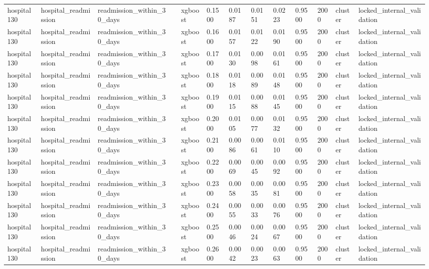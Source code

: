 \begin{tabular}{lllllllllllll}
hospital130 & hospital\_readmission & readmission\_within\_30\_days &  & xgboost & 0.1500 & 0.0187 & 0.0151 & 0.0223 & 0.9500 & 2000 & cluster & locked\_internal\_validation \\
hospital130 & hospital\_readmission & readmission\_within\_30\_days &  & xgboost & 0.1600 & 0.0157 & 0.0122 & 0.0190 & 0.9500 & 2000 & cluster & locked\_internal\_validation \\
hospital130 & hospital\_readmission & readmission\_within\_30\_days &  & xgboost & 0.1700 & 0.0130 & 0.0098 & 0.0161 & 0.9500 & 2000 & cluster & locked\_internal\_validation \\
hospital130 & hospital\_readmission & readmission\_within\_30\_days &  & xgboost & 0.1800 & 0.0118 & 0.0089 & 0.0148 & 0.9500 & 2000 & cluster & locked\_internal\_validation \\
hospital130 & hospital\_readmission & readmission\_within\_30\_days &  & xgboost & 0.1900 & 0.0115 & 0.0088 & 0.0145 & 0.9500 & 2000 & cluster & locked\_internal\_validation \\
hospital130 & hospital\_readmission & readmission\_within\_30\_days &  & xgboost & 0.2000 & 0.0105 & 0.0077 & 0.0132 & 0.9500 & 2000 & cluster & locked\_internal\_validation \\
hospital130 & hospital\_readmission & readmission\_within\_30\_days &  & xgboost & 0.2100 & 0.0086 & 0.0061 & 0.0110 & 0.9500 & 2000 & cluster & locked\_internal\_validation \\
hospital130 & hospital\_readmission & readmission\_within\_30\_days &  & xgboost & 0.2200 & 0.0069 & 0.0045 & 0.0092 & 0.9500 & 2000 & cluster & locked\_internal\_validation \\
hospital130 & hospital\_readmission & readmission\_within\_30\_days &  & xgboost & 0.2300 & 0.0058 & 0.0035 & 0.0081 & 0.9500 & 2000 & cluster & locked\_internal\_validation \\
hospital130 & hospital\_readmission & readmission\_within\_30\_days &  & xgboost & 0.2400 & 0.0055 & 0.0033 & 0.0076 & 0.9500 & 2000 & cluster & locked\_internal\_validation \\
hospital130 & hospital\_readmission & readmission\_within\_30\_days &  & xgboost & 0.2500 & 0.0046 & 0.0024 & 0.0067 & 0.9500 & 2000 & cluster & locked\_internal\_validation \\
hospital130 & hospital\_readmission & readmission\_within\_30\_days &  & xgboost & 0.2600 & 0.0042 & 0.0023 & 0.0063 & 0.9500 & 2000 & cluster & locked\_internal\_validation \\

\end{tabular}
